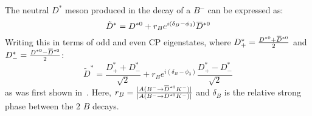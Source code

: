 \documentclass[oneside,12pt]{article}
\newcommand{\overbar}[1]{\mkern 1.5mu\overline{\mkern-1.5mu#1\mkern-1.5mu}\mkern 1.5mu}
\begin{document}
\noindent The neutral ${D}^*$ meson produced in the decay of a $B^-$ can be expressed as:
  \begin{equation}
    \tilde{D}^*=D^{*0}+r_Be^{i(\delta_B-\phi_3)}\overbar{D}^{*0}
    \label{eq:DstTilde}
  \end{equation}
\noindent Writing this in terms of odd and even CP eigenstates, where $D^{*}_{+}=\frac{D^{*0}+\overbar{D}^{*0}}{2}$ and $D^{*}_{-}=\frac{D^{*0}-\overbar{D}^{*0}}{2}$:
  \begin{equation}
    \tilde{D}^*=\frac{D^{*}_{+}+D^{*}_{-}}{\sqrt{2}}+r_Be^{i(\delta_B-\phi_3)}\frac{D^{*}_{+}-D^{*}_{-}}{\sqrt{2}}
    \label{eq:DstTildeCP}
  \end{equation}
\noindent as was first shown in~\cite{ADSDstar}. Here,
$r_B=\frac{|A(B^{-}\rightarrow \overbar{D}^{*0}K^-)|}{|A(B^{-}\rightarrow
{D}^{*0}K^-)|}$ and $\delta_{B}$ is the relative strong phase between the 2 $B$
decays.
 
\end{document}
